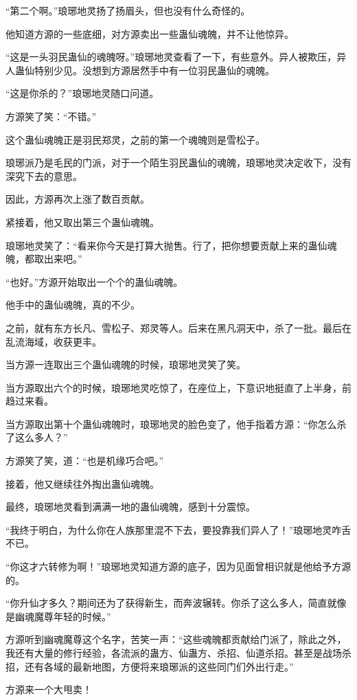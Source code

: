\begin{this_body}
“第二个啊。”琅琊地灵扬了扬眉头，但也没有什么奇怪的。

他知道方源的一些底细，对方源卖出一些蛊仙魂魄，并不让他惊异。

“这是一头羽民蛊仙的魂魄呀。”琅琊地灵查看了一下，有些意外。异人被欺压，异人蛊仙特别少见。没想到方源居然手中有一位羽民蛊仙的魂魄。

“这是你杀的？”琅琊地灵随口问道。

方源笑了笑：“不错。”

这个蛊仙魂魄正是羽民郑灵，之前的第一个魂魄则是雪松子。

琅琊派乃是毛民的门派，对于一个陌生羽民蛊仙的魂魄，琅琊地灵决定收下，没有深究下去的意思。

因此，方源再次上涨了数百贡献。

紧接着，他又取出第三个蛊仙魂魄。

琅琊地灵笑了：“看来你今天是打算大抛售。行了，把你想要贡献上来的蛊仙魂魄，都取出来吧。”

“也好。”方源开始取出一个个的蛊仙魂魄。

他手中的蛊仙魂魄，真的不少。

之前，就有东方长凡、雪松子、郑灵等人。后来在黑凡洞天中，杀了一批。最后在乱流海域，收获更丰。

当方源一连取出三个蛊仙魂魄的时候，琅琊地灵笑了笑。

当方源取出六个的时候，琅琊地灵吃惊了，在座位上，下意识地挺直了上半身，前趋过来看。

当方源取出第十个蛊仙魂魄时，琅琊地灵的脸色变了，他手指着方源：“你怎么杀了这么多人？”

方源笑了笑，道：“也是机缘巧合吧。”

接着，他又继续往外掏出蛊仙魂魄。

最终，琅琊地灵看到满满一地的蛊仙魂魄，感到十分震惊。

“我终于明白，为什么你在人族那里混不下去，要投靠我们异人了！”琅琊地灵咋舌不已。

“你这才六转修为啊！”琅琊地灵知道方源的底子，因为见面曾相识就是他给予方源的。

“你升仙才多久？期间还为了获得新生，而奔波辗转。你杀了这么多人，简直就像是幽魂魔尊年轻的时候。”

方源听到幽魂魔尊这个名字，苦笑一声：“这些魂魄都贡献给门派了，除此之外，我还有大量的修行经验，各流派的蛊方、仙蛊方、杀招、仙道杀招。甚至是战场杀招，还有各域的最新地图，方便将来琅琊派的这些同门们外出行走。”

方源来一个大甩卖！


\end{this_body}
